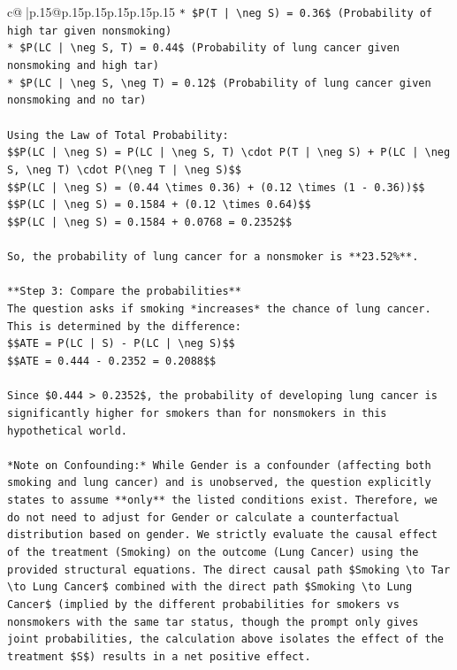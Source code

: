 \documentclass{article}
\begin{document}
{\begin{supertabular}{c@{$\;$}|p{.15\linewidth}@{}p{.15\linewidth}p{.15\linewidth}p{.15\linewidth}p{.15\linewidth}p{.15\linewidth}}
{{{\texttt{*   \$P(T | \textbackslash{}neg S) = 0.36\$ (Probability of high tar given nonsmoking)} \\
\texttt{*   \$P(LC | \textbackslash{}neg S, T) = 0.44\$ (Probability of lung cancer given nonsmoking and high tar)} \\
\texttt{*   \$P(LC | \textbackslash{}neg S, \textbackslash{}neg T) = 0.12\$ (Probability of lung cancer given nonsmoking and no tar)} \\
\\ 
\texttt{Using the Law of Total Probability:} \\
\texttt{\$\$P(LC | \textbackslash{}neg S) = P(LC | \textbackslash{}neg S, T) \textbackslash{}cdot P(T | \textbackslash{}neg S) + P(LC | \textbackslash{}neg S, \textbackslash{}neg T) \textbackslash{}cdot P(\textbackslash{}neg T | \textbackslash{}neg S)\$\$} \\
\texttt{\$\$P(LC | \textbackslash{}neg S) = (0.44 \textbackslash{}times 0.36) + (0.12 \textbackslash{}times (1 {-} 0.36))\$\$} \\
\texttt{\$\$P(LC | \textbackslash{}neg S) = 0.1584 + (0.12 \textbackslash{}times 0.64)\$\$} \\
\texttt{\$\$P(LC | \textbackslash{}neg S) = 0.1584 + 0.0768 = 0.2352\$\$} \\
\\ 
\texttt{So, the probability of lung cancer for a nonsmoker is **23.52\%**.} \\
\\ 
\texttt{**Step 3: Compare the probabilities**} \\
\texttt{The question asks if smoking *increases* the chance of lung cancer. This is determined by the difference:} \\
\texttt{\$\$ATE = P(LC | S) {-} P(LC | \textbackslash{}neg S)\$\$} \\
\texttt{\$\$ATE = 0.444 {-} 0.2352 = 0.2088\$\$} \\
\\ 
\texttt{Since \$0.444 > 0.2352\$, the probability of developing lung cancer is significantly higher for smokers than for nonsmokers in this hypothetical world.} \\
\\ 
\texttt{*Note on Confounding:* While Gender is a confounder (affecting both smoking and lung cancer) and is unobserved, the question explicitly states to assume **only** the listed conditions exist. Therefore, we do not need to adjust for Gender or calculate a counterfactual distribution based on gender. We strictly evaluate the causal effect of the treatment (Smoking) on the outcome (Lung Cancer) using the provided structural equations. The direct causal path \$Smoking \textbackslash{}to Tar \textbackslash{}to Lung Cancer\$ combined with the direct path \$Smoking \textbackslash{}to Lung Cancer\$ (implied by the different probabilities for smokers vs nonsmokers with the same tar status, though the prompt only gives joint probabilities, the calculation above isolates the effect of the treatment \$S\$) results in a net positive effect.} \\
}}}
\end{supertabular}}
\end{document}
